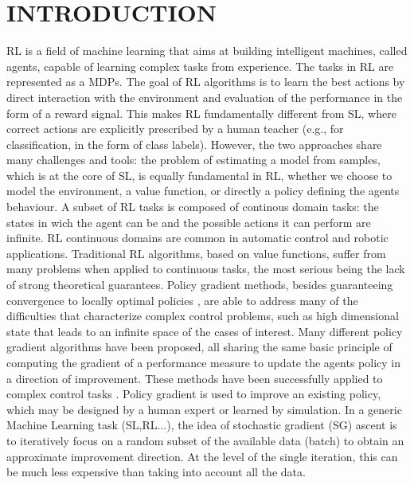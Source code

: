 
\chapter{INTRODUCTION} \label{chap:aChapter}

\ac{RL} is a field of machine learning that aims at building intelligent machines, called agents, capable of learning complex tasks from experience.
The tasks in \acs{RL} are represented as a \acs{MDP}s. 
The goal of \acs{RL} \citep{sutton1998reinforcement} algorithms is to learn the best actions by direct interaction with the environment and evaluation of the performance in the form of a reward signal.
This makes \acs{RL} fundamentally different from \ac{SL}, where correct actions are explicitly prescribed by a human teacher (e.g., for classification, in the form of class labels).
However, the two approaches share many challenges and tools: the problem of estimating a model from samples, which is at the core of \acs{SL}, is equally fundamental in \acs{RL}, whether we choose to model the environment, a value function, or directly a policy defining the agent\textquotesingle s behaviour.
A subset of \acs{RL} tasks is composed of continous domain tasks: the states in wich the agent can be and the possible actions it can perform are infinite.
\acs{RL} continuous domains are common in automatic control and robotic applications. Traditional \acs{RL} algorithms, based on value functions, suffer from many problems when applied to continuous tasks, the most serious being the lack of strong theoretical guarantees. Policy gradient methods, besides guaranteeing convergence to locally optimal policies \citep{sutton2000policy}, are able to address many of the difficulties that characterize complex control problems, such as high dimensional state that leads to an infinite space of the cases of interest. 
Many different policy gradient algorithms have been proposed, all sharing the same basic principle of computing the gradient of a performance measure to update the agent\textquotesingle s policy in a direction of improvement. These methods have been successfully applied to complex control tasks \citep{deisenroth2013survey}. Policy gradient is used to improve an existing policy, which may be designed by a human expert or learned by simulation.\newline
In a generic Machine Learning task (\acs{SL},\acs{RL}...), the idea of stochastic gradient (\acs{SG}) ascent \citep{nesterov2013introductory} is to iteratively focus on a random subset of the available data (batch) to obtain an approximate improvement direction. At the level of the single iteration, this can be much less expensive than taking into account all the data.
